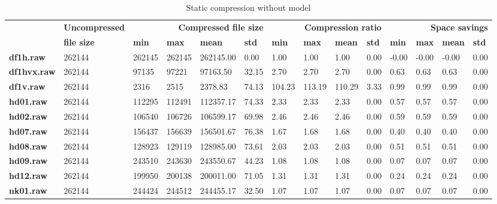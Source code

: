 \begin{table}
\centering
\footnotesize
\begin{tabular}{l|l|llll|llll|llll}
    & \textbf{Uncompressed} & \multicolumn{4}{r|}{\textbf{Compressed file size}} & \multicolumn{4}{r|}{\textbf{Compression ratio}} & \multicolumn{4}{r}{\textbf{Space savings}} \\
    & \textbf{file size} & \textbf{min} & \textbf{max} & \textbf{mean} & \textbf{std} & \textbf{min} & \textbf{max} & \textbf{mean} & \textbf{std} & \textbf{min} & \textbf{max} & \textbf{mean} & \textbf{std} \\
\hline
    \textbf{df1h.raw} & 262144 & 262145 & 262145 & 262145.00 & 0.00 & 1.00 & 1.00 & 1.00 & 0.00 & -0.00 & -0.00 & -0.00 & 0.00 \\
    \textbf{df1hvx.raw} & 262144 & 97135 & 97221 & 97163.50 & 32.15 & 2.70 & 2.70 & 2.70 & 0.00 & 0.63 & 0.63 & 0.63 & 0.00 \\
    \textbf{df1v.raw} & 262144 & 2316 & 2515 & 2378.83 & 74.13 & 104.23 & 113.19 & 110.29 & 3.33 & 0.99 & 0.99 & 0.99 & 0.00 \\
    \textbf{hd01.raw} & 262144 & 112295 & 112491 & 112357.17 & 74.33 & 2.33 & 2.33 & 2.33 & 0.00 & 0.57 & 0.57 & 0.57 & 0.00 \\
    \textbf{hd02.raw} & 262144 & 106540 & 106726 & 106599.17 & 69.98 & 2.46 & 2.46 & 2.46 & 0.00 & 0.59 & 0.59 & 0.59 & 0.00 \\
    \textbf{hd07.raw} & 262144 & 156437 & 156639 & 156501.67 & 76.38 & 1.67 & 1.68 & 1.68 & 0.00 & 0.40 & 0.40 & 0.40 & 0.00 \\
    \textbf{hd08.raw} & 262144 & 128923 & 129119 & 128985.00 & 73.61 & 2.03 & 2.03 & 2.03 & 0.00 & 0.51 & 0.51 & 0.51 & 0.00 \\
    \textbf{hd09.raw} & 262144 & 243510 & 243630 & 243550.67 & 44.23 & 1.08 & 1.08 & 1.08 & 0.00 & 0.07 & 0.07 & 0.07 & 0.00 \\
    \textbf{hd12.raw} & 262144 & 199950 & 200138 & 200011.00 & 71.05 & 1.31 & 1.31 & 1.31 & 0.00 & 0.24 & 0.24 & 0.24 & 0.00 \\
    \textbf{nk01.raw} & 262144 & 244424 & 244512 & 244455.17 & 32.50 & 1.07 & 1.07 & 1.07 & 0.00 & 0.07 & 0.07 & 0.07 & 0.00 \\
\end{tabular}
\caption{Static compression without model}
\end{table}